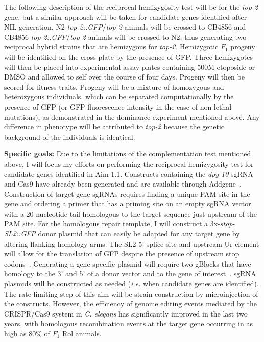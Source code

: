 \documentclass[12pt]{article}
\begin{document}
The following description of the reciprocal hemizygosity test will be for the {\it top-2} gene, but a similar approach will be taken for candidate genes identified after NIL generation. N2 {\it\textDelta top-2::GFP}/{\it top-2} animals will be crossed to CB4856 and CB4856 {\it\textDelta top-2::GFP}/{\it top-2} animals will be crossed to N2, thus generating two reciprocal hybrid strains that are hemizygous for {\it top-2}. Hemizygotic $F_{1}$ progeny will be identified on the cross plate by the presence of GFP. Three hemizygotes will then be placed into experimental assay plates containing 500\textmu M etoposide or DMSO and allowed to self over the course of four days. Progeny will then be scored for fitness traits. Progeny will be a mixture of homozygous and heterozygous individuals, which can be separated computationally by the presence of GFP (or GFP fluorescence intensity in the case of non-lethal mutations), as demonstrated in the dominance experiment mentioned above. Any difference in phenotype will be attributed to {\it top-2} because the genetic background of the individuals is identical. 

\vspace{5pt}

{\bf Specific goals: }Due to the limitations of the complementation test mentioned above, I will focus my efforts on performing the reciprocal hemizygosity test for candidate genes identified in Aim 1.1. Constructs containing the {\it dpy-10} sgRNA and Cas9 have already been generated and are available through Addgene~\cite{Arribere:2014ku}. Construction of target gene sgRNAs requires finding a unique PAM site in the gene and ordering a primer that has a priming site on an empty sgRNA vector with a 20 nucleotide tail homologous to the target sequence just upstream of the PAM site. For the homologous repair template, I will construct a 3x-{\it stop}-{\it SL2::GFP} donor plasmid that can easily be adapted for any target gene by altering flanking homology arms. The SL2 5' splice site and upstream Ur element will allow for the translation of GFP despite the presence of upstream stop codons~\cite{McGrath:2009dx}. Generating a gene-specific plasmid will require two gBlocks that have homology to the 3' and 5' of a donor vector and to the gene of interest~\cite{Gibson:2009bc}. sgRNA plasmids will be constructed as needed ({\it i.e.} when candidate genes are identified). The rate limiting step of this aim will be strain construction by microinjection of the constructs. However, the efficiency of genome editing events mediated by the CRISPR/Cas9 system in {\it C. elegans} has significantly improved in the last two years, with homologous recombination events at the target gene occurring in as high as 80\% of $F_{1}$ Rol animals. 
\end{document}
